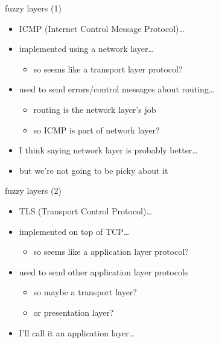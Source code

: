 
\begin{frame}{fuzzy layers (1)}
    \begin{itemize}
    \item ICMP (Internet Control Message Protocol)\ldots
    \item {implemented using a network layer}\ldots
        \begin{itemize}
        \item so seems like a transport layer protocol?
        \end{itemize}
    \item<2-> used to send errors/control messages about routing\ldots
        \begin{itemize}
        \item routing is the network layer's job
        \item so ICMP is part of network layer?
        \end{itemize}
    \vspace{.5cm}
    \item<3-> I think saying network layer is probably better\ldots
    \item<3-> but we're not going to be picky about it
    \end{itemize}
\end{frame}

\begin{frame}{fuzzy layers (2)}
    \begin{itemize}
    \item TLS (Transport Control Protocol)\ldots
    \item implemented on top of TCP\ldots
        \begin{itemize}
        \item so seems like a application layer protocol?
        \end{itemize}
    \item<2-> used to send other application layer protocols
        \begin{itemize}
        \item so maybe a transport layer?
        \item or presentation layer?
        \end{itemize}
    \vspace{.5cm}
    \item<2-> I'll call it an application layer\ldots
    \end{itemize}
\end{frame}

